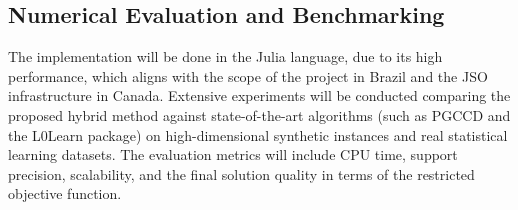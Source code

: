 \subsection{Numerical Evaluation and Benchmarking}
The implementation will be done in the Julia language, due to its high performance, which aligns with the scope of the project in Brazil and the JSO infrastructure in Canada. Extensive experiments will be conducted comparing the proposed hybrid method against state-of-the-art algorithms (such as PGCCD and the L0Learn package) on high-dimensional synthetic instances and real statistical learning datasets. The evaluation metrics will include CPU time, support precision, scalability, and the final solution quality in terms of the restricted objective function.
